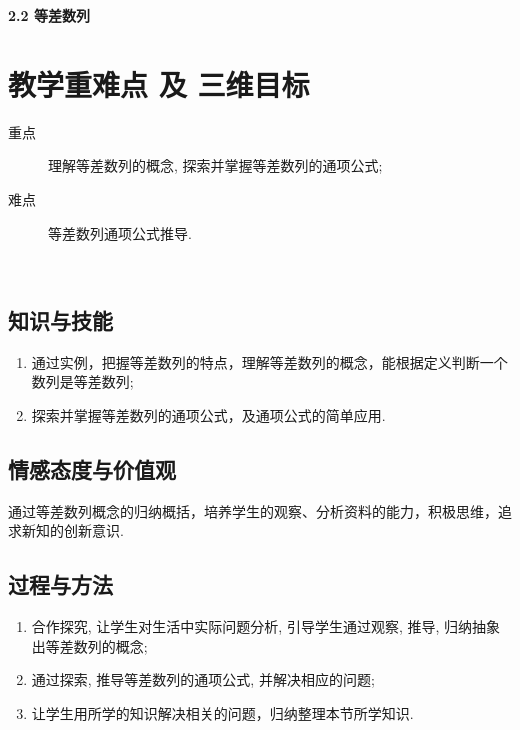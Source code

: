 \documentclass[10pt,a4paper]{article}
\begin{document}
\centerline{\Large{\textbf{2.2 等差数列}}}

	\section{教学重难点 及 三维目标}

		\begin{description}

			\item[重点] 理解等差数列的概念, 探索并掌握等差数列的通项公式; 

			\item[难点] 等差数列通项公式推导. 

		\end{description}


　　		\subsection{知识与技能}
			\begin{enumerate}
				\item 通过实例，把握等差数列的特点，理解等差数列的概念，能根据定义判断一个数列是等差数列; 
				\item 探索并掌握等差数列的通项公式，及通项公式的简单应用. 
			\end{enumerate}

		\subsection{情感态度与价值观}
			通过等差数列概念的归纳概括，培养学生的观察、分析资料的能力，积极思维，追求新知的创新意识. 

		\subsection{过程与方法}
			\begin{enumerate}

				\item 合作探究, 让学生对生活中实际问题分析, 引导学生通过观察, 推导, 归纳抽象出等差数列的概念; 

				\item 通过探索, 推导等差数列的通项公式, 并解决相应的问题; 

				\item 让学生用所学的知识解决相关的问题，归纳整理本节所学知识. 

			\end{enumerate}
\end{document}
